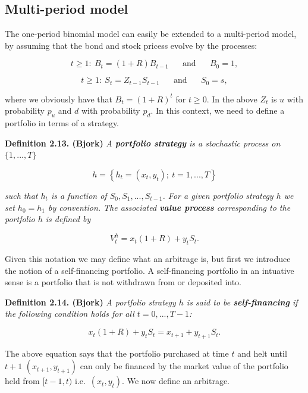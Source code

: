 \documentclass[
]{book}
\begin{document}
\newpage

\hypertarget{multi-period-model}{%
\subsection{Multi-period model}\label{multi-period-model}}

The one-period binomial model can easily be extended to a multi-period model, by assuming that the bond and stock pricess evolve by the processes:

\[
t\ge1:\ B_t=(1+R)B_{t-1}\hspace{20pt}\text{and}\hspace{20pt}B_0=1,
\]

\[
t\ge1:\ S_t=Z_{t-1}S_{t-1}\hspace{20pt}\text{and}\hspace{20pt}S_0=s,
\]

where we obviously have that \(B_t=(1+R)^t\) for \(t\ge 0\). In the above \(Z_t\) is \(u\) with probability \(p_u\) and \(d\) with probability \(p_d\). In this context, we need to define a portfolio in terms of a strategy.

\textbf{Definition 2.13. (Bjork)} \emph{A \textbf{portfolio strategy} is a stochastic process on \(\{1,...,T\}\)}

\[
h=\left\{h_t=(x_t,y_t);\ t=1,...,T\right\}
\]

\emph{such that \(h_t\) is a function of \(S_0,S_1,...,S_{t-1}\). For a given portfolio strategy \(h\) we set \(h_0=h_1\) by convention. The associated \textbf{value process} corresponding to the portfolio \(h\) is defined by}

\[
V_t^h=x_t(1+R)+y_tS_t.
\]

Given this notation we may define what an arbitrage is, but first we introduce the notion of a self-financing portfolio. A self-financing portfolio in an intuative sense is a portfolio that is not withdrawn from or deposited into.

\textbf{Definition 2.14. (Bjork)} \emph{A portfolio strategy \(h\) is said to be \textbf{self-financing} if the following condition holds for all \(t=0,...,T-1\):}

\[
x_t(1+R)+y_tS_t=x_{t+1}+y_{t+1}S_t.
\]

The above equation says that the portfolio purchased at time \(t\) and helt until \(t+1\) \((x_{t+1},y_{t+1})\) can only be financed by the market value of the portfolio held from \([t-1,t)\) i.e.~\((x_{t},y_{t})\). We now define an arbitrage.
\end{document}
